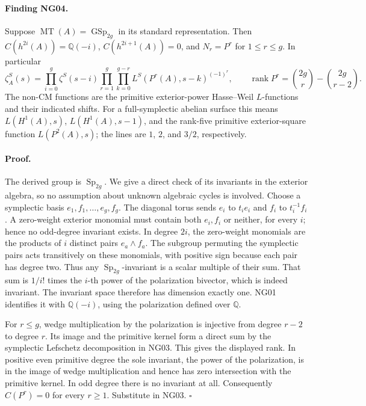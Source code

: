 \paragraph{Finding NG04.}
Suppose $\operatorname{MT}(A)=\operatorname{GSp}_{2g}$ in its standard
representation.  Then $C(h^{2i}(A))=\mathbb Q(-i)$,
$C(h^{2i+1}(A))=0$, and $N_r=P^r$ for $1\le r\le g$.
In particular
\[
 \zeta_A^S(s)=\prod_{i=0}^g\zeta^S(s-i)
       \prod_{r=1}^g\prod_{k=0}^{g-r}L^S(P^r(A),s-k)^{(-1)^r},
 \qquad \operatorname{rank}P^r={2g\choose r}-{2g\choose r-2}. \tag{NG04.1}
\]
The non-CM functions are the primitive exterior-power Hasse--Weil
$L$-functions and their indicated shifts.  For a full-symplectic
abelian surface this means $L(H^1(A),s)$,
$L(H^1(A),s-1)$, and the rank-five primitive exterior-square function
$L(P^2(A),s)$; the lines are $1$, $2$, and $3/2$, respectively.

\paragraph{Proof.}
The derived group is $\operatorname{Sp}_{2g}$.  We give a direct check
of its invariants in the exterior algebra, so no assumption about
unknown algebraic cycles is involved.  Choose a symplectic basis
$e_1,f_1,\ldots,e_g,f_g$.  The diagonal torus sends $e_i$ to $t_i e_i$
and $f_i$ to $t_i^{-1}f_i$.  A zero-weight exterior monomial must
contain both $e_i,f_i$ or neither, for every $i$; hence no odd-degree
invariant exists.  In degree $2i$, the zero-weight monomials are the
products of $i$ distinct pairs $e_a\wedge f_a$.  The subgroup
permuting the symplectic pairs acts transitively on these monomials,
with positive sign because each pair has degree two.  Thus any
$\operatorname{Sp}_{2g}$-invariant is a scalar multiple of their sum.
That sum is $1/i!$ times the $i$-th power of the polarization bivector,
which is indeed invariant.  The invariant space therefore has
dimension exactly one.  NG01 identifies it with $\mathbb Q(-i)$,
using the polarization defined over $\mathbb Q$.

For $r\le g$, wedge multiplication by the polarization is injective
from degree $r-2$ to degree $r$.  Its image and the primitive kernel
form a direct sum by the symplectic Lefschetz decomposition in NG03.
This gives the displayed rank.  In positive even primitive degree
the sole invariant, the power of the polarization, is in the image
of wedge multiplication and hence has zero intersection with the
primitive kernel.  In odd degree there is no invariant at all.
Consequently $C(P^r)=0$ for every $r\ge1$.  Substitute in NG03.
\hfill$\square$

